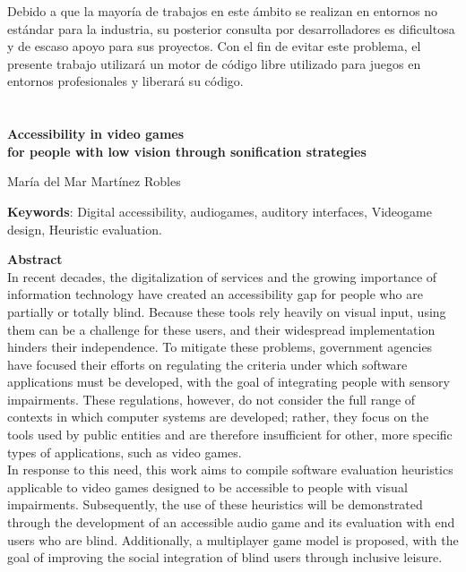 	Debido a que la mayoría de trabajos en este ámbito se realizan en entornos no estándar para la industria, su posterior consulta por desarrolladores es dificultosa y de escaso apoyo para sus proyectos. Con el fin de evitar este problema, el presente trabajo utilizará un motor de código libre utilizado para juegos en entornos profesionales y liberará su código. \\
	\newpage
\thispagestyle{empty}	
\chapter*{}
\thispagestyle{empty}
\begin{center}
	{\large\bfseries Accessibility in video games
 \\ for people with low vision through
sonification strategies }\\
\end{center}
\begin{center}
	María del Mar Martínez Robles\\
\end{center}
\vspace{0.5cm}
\noindent\textbf{Keywords}: Digital accessibility, audiogames, auditory interfaces, Videogame design, Heuristic evaluation. 
\vspace{0.7cm}

\noindent\textbf{Abstract}\\

In recent decades, the digitalization of services and the growing importance of information technology have created an accessibility gap for people who are partially or totally blind. Because these tools rely heavily on visual input, using them can be a challenge for these users, and their widespread implementation hinders their independence. To mitigate these problems, government agencies have focused their efforts on regulating the criteria under which software applications must be developed, with the goal of integrating people with sensory impairments. These regulations, however, do not consider the full range of contexts in which computer systems are developed; rather, they focus on the tools used by public entities and are therefore insufficient for other, more specific types of applications, such as video games. \\

In response to this need, this work aims to compile software evaluation heuristics applicable to video games designed to be accessible to people with visual impairments. Subsequently, the use of these heuristics will be demonstrated through the development of an accessible audio game and its evaluation with end users who are blind. Additionally, a multiplayer game model is proposed, with the goal of improving the social integration of blind users through inclusive leisure.\\

